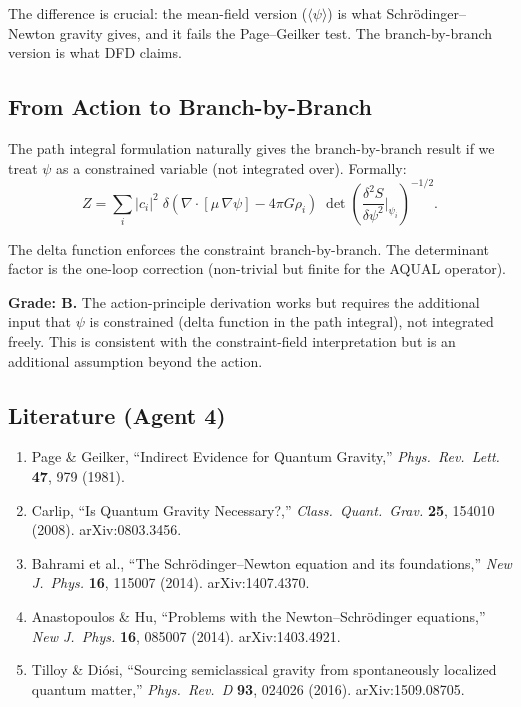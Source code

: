 \documentclass[11pt,a4paper]{article}
\begin{document}
The difference is crucial: the mean-field version ($\langle\psi\rangle$) is what Schr\"odinger--Newton gravity gives, and it fails the Page--Geilker test. The branch-by-branch version is what DFD claims.

\subsection{From Action to Branch-by-Branch}

The path integral formulation naturally gives the branch-by-branch result if we treat $\psi$ as a constrained variable (not integrated over). Formally:
\begin{equation}
Z = \sum_i |c_i|^2\;\delta\!\left(\nabla \cdot [\mu\,\nabla\psi] - 4\pi G\rho_i\right)\;\det\!\left(\frac{\delta^2 S}{\delta\psi^2}\biggr|_{\psi_i}\right)^{-1/2}.
\end{equation}

The delta function enforces the constraint branch-by-branch. The determinant factor is the one-loop correction (non-trivial but finite for the AQUAL operator).

\textbf{Grade: B.} The action-principle derivation works but requires the additional input that $\psi$ is constrained (delta function in the path integral), not integrated freely. This is consistent with the constraint-field interpretation but is an additional assumption beyond the action.

\subsection{Literature (Agent 4)}

\begin{enumerate}
\item Page \& Geilker, ``Indirect Evidence for Quantum Gravity,'' \textit{Phys.\ Rev.\ Lett.} \textbf{47}, 979 (1981).
\item Carlip, ``Is Quantum Gravity Necessary?,'' \textit{Class.\ Quant.\ Grav.} \textbf{25}, 154010 (2008). arXiv:0803.3456.
\item Bahrami et al., ``The Schr\"odinger--Newton equation and its foundations,'' \textit{New J.\ Phys.} \textbf{16}, 115007 (2014). arXiv:1407.4370.
\item Anastopoulos \& Hu, ``Problems with the Newton--Schr\"odinger equations,'' \textit{New J.\ Phys.} \textbf{16}, 085007 (2014). arXiv:1403.4921.
\item Tilloy \& Di\'osi, ``Sourcing semiclassical gravity from spontaneously localized quantum matter,'' \textit{Phys.\ Rev.\ D} \textbf{93}, 024026 (2016). arXiv:1509.08705.
\end{enumerate}
\end{document}
